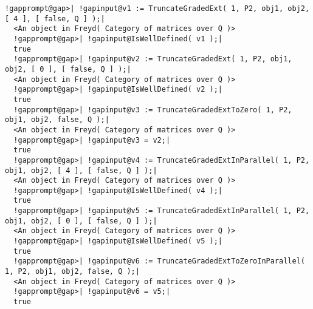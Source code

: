 \documentclass[a4paper,11pt]{report}
\begin{document}
{{{\begin{Verbatim}[commandchars=!@|,fontsize=\small,frame=single,label=Example]
  !gapprompt@gap>| !gapinput@v1 := TruncateGradedExt( 1, P2, obj1, obj2, [ 4 ], [ false, Q ] );|
  <An object in Freyd( Category of matrices over Q )>
  !gapprompt@gap>| !gapinput@IsWellDefined( v1 );|
  true
  !gapprompt@gap>| !gapinput@v2 := TruncateGradedExt( 1, P2, obj1, obj2, [ 0 ], [ false, Q ] );|
  <An object in Freyd( Category of matrices over Q )>
  !gapprompt@gap>| !gapinput@IsWellDefined( v2 );|
  true
  !gapprompt@gap>| !gapinput@v3 := TruncateGradedExtToZero( 1, P2, obj1, obj2, false, Q );|
  <An object in Freyd( Category of matrices over Q )>
  !gapprompt@gap>| !gapinput@v3 = v2;|
  true
  !gapprompt@gap>| !gapinput@v4 := TruncateGradedExtInParallel( 1, P2, obj1, obj2, [ 4 ], [ false, Q ] );|
  <An object in Freyd( Category of matrices over Q )>
  !gapprompt@gap>| !gapinput@IsWellDefined( v4 );|
  true
  !gapprompt@gap>| !gapinput@v5 := TruncateGradedExtInParallel( 1, P2, obj1, obj2, [ 0 ], [ false, Q ] );|
  <An object in Freyd( Category of matrices over Q )>
  !gapprompt@gap>| !gapinput@IsWellDefined( v5 );|
  true
  !gapprompt@gap>| !gapinput@v6 := TruncateGradedExtToZeroInParallel( 1, P2, obj1, obj2, false, Q );|
  <An object in Freyd( Category of matrices over Q )>
  !gapprompt@gap>| !gapinput@v6 = v5;|
  true
\end{Verbatim}
 }

 }

 }

   
\end{document}
